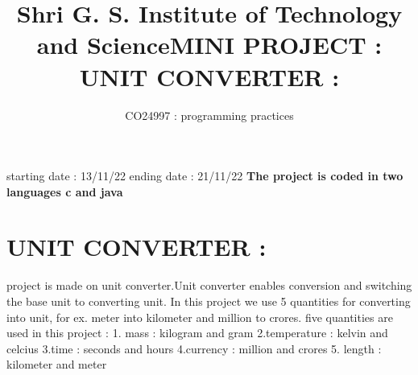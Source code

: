 \documentclass[12pt,a10paper]{report}
\title{\textbf{Shri G. S. Institute of Technology and Science}}
\author{\Huge{CO24997 : programming practices}}
{\huge{\date{\today}}}
\begin{document}
\maketitle
\title{\textbf{\large{MINI PROJECT :  UNIT CONVERTER :}}}
\large{starting date : 13/11/22 }\newline
\large{ending date : 21/11/22}\newline\newline
\textbf{\large{ The project is coded in two languages c and java }}\newline\newline
\section{\textbf{UNIT CONVERTER :}}
\large{project is made on unit converter.Unit converter enables conversion and switching the base unit to converting unit. In this project we use 5 quantities for converting into unit, for ex.  meter into kilometer and million to crores.}\newline\newline
\huge{ five quantities are used in this project :}\newline\newline
\large{1. mass : kilogram and gram} \newline\newline
\large{2.temperature  : kelvin and  celcius}  \newline\newline
\large{3.time : seconds and  hours}\newline\newline
\large{4.currency :   million and  crores }\newline\newline
\large{5. length : kilometer and  meter }\newline\newline
\end{document}
